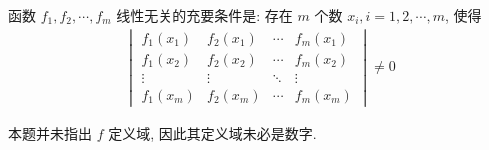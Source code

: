 \documentclass[../../main.tex]{subfiles}%
\begin{document}
\begin{theorem}\label{theorem:函数线性无关的充要条件}
函数 \( f_1, f_2, \cdots, f_m \) 线性无关的充要条件是: 存在 \( m \) 个数 \( x_i, i = 1, 2, \cdots, m \), 使得
\begin{align}
\begin{vmatrix}
f_1(x_1) & f_2(x_1) & \cdots & f_m(x_1) \\
f_1(x_2) & f_2(x_2) & \cdots & f_m(x_2) \\
\vdots & \vdots & \ddots & \vdots \\
f_1(x_m) & f_2(x_m) & \cdots & f_m(x_m)
\end{vmatrix} \neq 0 \label{eq::::------89237878971249}
\end{align}
\end{theorem}
\begin{remark}
本题并未指出 \( f \) 定义域, 因此其定义域未必是数字.
\end{remark}
\end{document}
